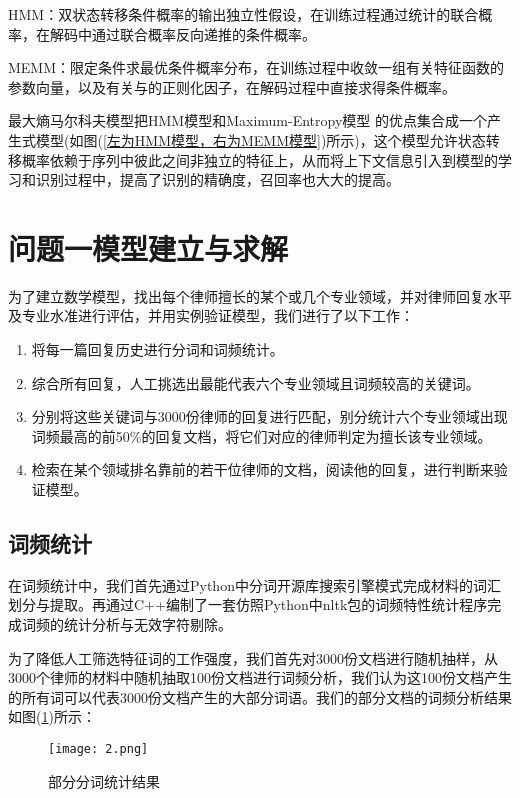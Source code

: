 \documentclass[bwprint]{cumcmthesis}
\begin{document}
HMM：双状态转移条件概率的输出独立性假设，在训练过程通过统计的联合概率，在解码中通过联合概率反向递推的条件概率。

MEMM：限定条件求最优条件概率分布，在训练过程中收敛一组有关特征函数的参数向量，以及有关与的正则化因子，在解码过程中直接求得条件概率。 

最大熵马尔科夫模型把HMM模型和Maximum-Entropy模型 的优点集合成一个产生式模型(如图(\ref{左为HMM模型，右为MEMM模型})所示)，这个模型允许状态转移概率依赖于序列中彼此之间非独立的特征上，从而将上下文信息引入到模型的学习和识别过程中，提高了识别的精确度，召回率也大大的提高。

\section{问题一模型建立与求解}
为了建立数学模型，找出每个律师擅长的某个或几个专业领域，并对律师回复水平及专业水准进行评估，并用实例验证模型，我们进行了以下工作：

\begin{enumerate}
	\item 将每一篇回复历史进行分词和词频统计。
	\item 综合所有回复，人工挑选出最能代表六个专业领域且词频较高的关键词。
	\item 分别将这些关键词与3000份律师的回复进行匹配，别分统计六个专业领域出现词频最高的前50\%的回复文档，将它们对应的律师判定为擅长该专业领域。
	\item 检索在某个领域排名靠前的若干位律师的文档，阅读他的回复，进行判断来验证模型。
\end{enumerate}

\subsection{词频统计}
在词频统计中，我们首先通过Python中分词开源库搜索引擎模式完成材料的词汇划分与提取。再通过C++编制了一套仿照Python中nltk包的词频特性统计程序完成词频的统计分析与无效字符剔除。

为了降低人工筛选特征词的工作强度，我们首先对3000份文档进行随机抽样，从3000个律师的材料中随机抽取100份文档进行词频分析，我们认为这100份文档产生的所有词可以代表3000份文档产生的大部分词语。我们的部分文档的词频分析结果如图(\ref{部分分词统计结果})所示：

\begin{figure}[!htp]
\centering
\texttt{[image: 2.png]}
\caption{部分分词统计结果}
\label{部分分词统计结果}
\end{figure}
\end{document}
